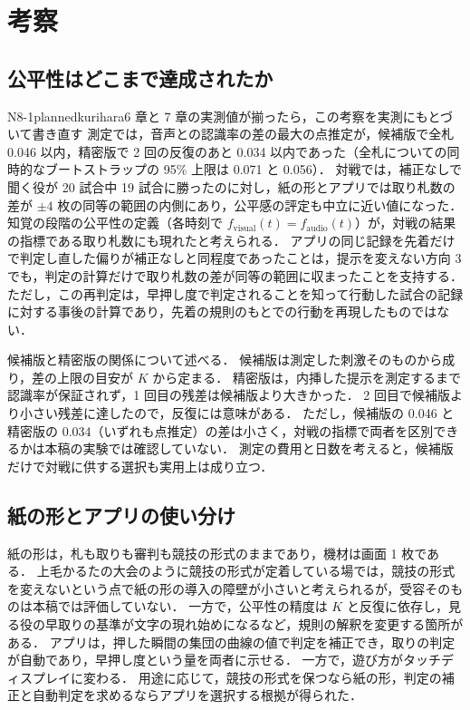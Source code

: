 \section{考察}

\subsection{公平性はどこまで達成されたか}

\begin{fd}{N8-1}{planned}{kurihara}{6 章と 7 章の実測値が揃ったら，この考察を実測にもとづいて書き直す}
測定では，音声との認識率の差の最大の点推定が，候補版で全札 0.046 以内，精密版で 2 回の反復のあと 0.034 以内であった（全札についての同時的なブートストラップの 95\% 上限は 0.071 と 0.056）．
対戦では，補正なしで聞く役が 20 試合中 19 試合に勝ったのに対し，紙の形とアプリでは取り札数の差が $\pm 4$ 枚の同等の範囲の内側にあり，公平感の評定も中立に近い値になった．
知覚の段階の公平性の定義（各時刻で $f_{\mathrm{visual}}(t) = f_{\mathrm{audio}}(t)$）が，対戦の結果の指標である取り札数にも現れたと考えられる．
アプリの同じ記録を先着だけで判定し直した偏りが補正なしと同程度であったことは，提示を変えない方向 3 でも，判定の計算だけで取り札数の差が同等の範囲に収まったことを支持する．
ただし，この再判定は，早押し度で判定されることを知って行動した試合の記録に対する事後の計算であり，先着の規則のもとでの行動を再現したものではない．
\end{fd}

候補版と精密版の関係について述べる．
候補版は測定した刺激そのものから成り，差の上限の目安が $K$ から定まる．
精密版は，内挿した提示を測定するまで認識率が保証されず，1 回目の残差は候補版より大きかった．
2 回目で候補版より小さい残差に達したので，反復には意味がある．
ただし，候補版の 0.046 と精密版の 0.034（いずれも点推定）の差は小さく，対戦の指標で両者を区別できるかは本稿の実験では確認していない．
測定の費用と日数を考えると，候補版だけで対戦に供する選択も実用上は成り立つ．

\subsection{紙の形とアプリの使い分け}

紙の形は，札も取りも審判も競技の形式のままであり，機材は画面 1 枚である．
上毛かるたの大会のように競技の形式が定着している場では，競技の形式を変えないという点で紙の形の導入の障壁が小さいと考えられるが，受容そのものは本稿では評価していない．
一方で，公平性の精度は $K$ と反復に依存し，見る役の早取りの基準が文字の現れ始めになるなど，規則の解釈を変更する箇所がある．
アプリは，押した瞬間の集団の曲線の値で判定を補正でき，取りの判定が自動であり，早押し度という量を両者に示せる．
一方で，遊び方がタッチディスプレイに変わる．
用途に応じて，競技の形式を保つなら紙の形，判定の補正と自動判定を求めるならアプリを選択する根拠が得られた．

